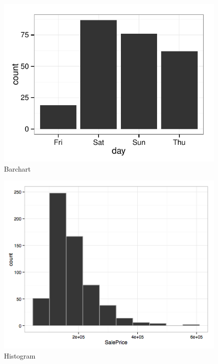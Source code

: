\begin{figure}[ht]
      \includegraphics[width=\columnwidth]{images/Tips-day-barchart.pdf}
      \caption{Barchart \cite{Viz}}
      \label{bar}
\end{figure}

\begin{figure}[ht]
      \includegraphics[width=\columnwidth]{images/Housingprice.png}
      \caption{Histogram \cite{Viz}}
      \label{hist}
    \end{figure}

